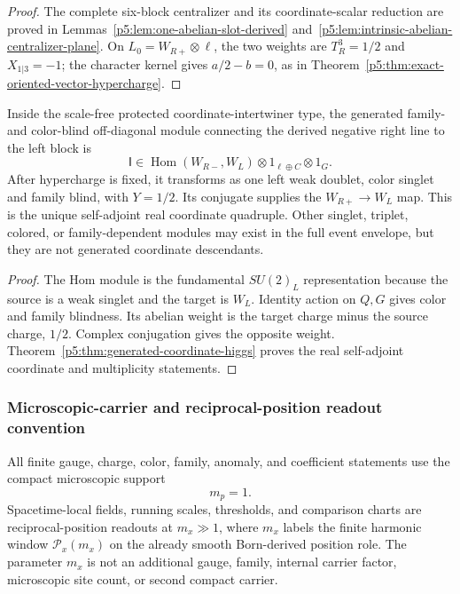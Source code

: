 \documentclass[12pt,a4paper]{article}
\begin{document}
\begin{proof}
The complete six-block centralizer and its coordinate-scalar reduction are
proved in Lemmas~\ref{p5:lem:one-abelian-slot-derived}
and~\ref{p5:lem:intrinsic-abelian-centralizer-plane}.  On
\(L_0=W_{R+}\otimes\ell\), the two weights are \(T_R^3=1/2\) and
\(X_{1|3}=-1\); the character kernel gives \(a/2-b=0\), as in
Theorem~\ref{p5:thm:exact-oriented-vector-hypercharge}.
\end{proof}

\begin{lemma}
\label{p5:lem:threshold-intertwiner-before-higgs}
Inside the scale-free protected coordinate-intertwiner type, the generated family- and color-blind
off-diagonal module connecting the derived negative right line to the left
block is
\begin{equation}
\label{p5:eq:primitive-threshold-intertwiner}
\mathsf I\in\operatorname{Hom}(W_{R-},W_L)\otimes1_{\ell\oplus C}\otimes1_G.
\end{equation}
After hypercharge is fixed, it transforms as one left weak doublet, color
singlet and family blind, with \(Y=1/2\).  Its conjugate supplies the
\(W_{R+}\to W_L\) map.  This is the unique self-adjoint real coordinate
quadruple.  Other singlet, triplet, colored, or family-dependent modules may
exist in the full event envelope, but they are not generated coordinate
descendants.
\end{lemma}

\begin{proof}
The Hom module is the fundamental \(SU(2)_L\) representation because the
source is a weak singlet and the target is \(W_L\).  Identity action on \(Q,G\)
gives color and family blindness.  Its abelian weight is the target charge
minus the source charge, \(1/2\).  Complex conjugation gives the opposite
weight.  Theorem~\ref{p5:thm:generated-coordinate-higgs} proves the real
self-adjoint coordinate and multiplicity statements.
\end{proof}


\subsubsection{Microscopic-carrier and reciprocal-position readout convention}
\label{p5:sec:mp-mx-carrier-convention}
All finite gauge, charge, color, family, anomaly, and coefficient statements use the compact microscopic support
\begin{equation}
\label{p5:eq:mp-mx-convention}
\boxed{m_p=1.}
\end{equation}
Spacetime-local fields, running scales, thresholds, and comparison charts are reciprocal-position readouts at \(m_x\gg1\), where \(m_x\) labels the finite harmonic window \(\mathcal P_x(m_x)\) on the already smooth Born-derived position role.  The parameter \(m_x\) is not an additional gauge, family, internal carrier factor, microscopic site count, or second compact carrier.
\end{document}
